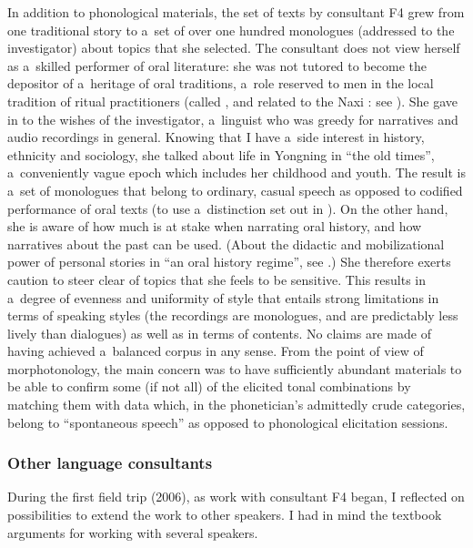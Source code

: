 In addition to phonological materials, the set of texts by consultant F4 grew from one traditional story to a~set of over one hundred monologues (addressed to the investigator) about topics that she selected. The consultant does not view herself as a~skilled performer of oral literature: she was not tutored to become the depositor of a~heritage of oral traditions, a~role reserved to men in the local tradition of ritual practitioners (called , and related to the Naxi : see \citealt{fangetal1995,lidazhu2015}). She gave in to the wishes of the investigator, a~linguist who was greedy for narratives and audio recordings in general. Knowing that I have a~side interest in history, ethnicity and sociology, she talked about life in Yongning in “the old times”, a~conveniently vague epoch which includes her childhood and youth. The result is a~set of monologues that belong to ordinary, casual speech as opposed to codified performance of oral texts (to use a~distinction set out in \citealt{dournes1990}). On the other hand, she is aware of how much is at stake when narrating {oral history}, and how narratives about the past can be used. (About the didactic and mobilizational power of personal stories in “an {oral history} regime”, see \citealt[100-105]{bulag2010}.) She therefore exerts caution to steer clear of topics that she feels to be sensitive. This results in a~degree of evenness and uniformity of style that entails strong limitations in terms of speaking styles (the recordings are monologues, and are predictably less lively than dialogues) as well as in terms of contents. No claims are made of having achieved a~balanced corpus in any sense. From the point of view of morphotonology, the main concern was to have sufficiently abundant materials to be able to confirm some (if not all) of the elicited tonal combinations by matching them with data which, in the phonetician's admittedly crude categories, belong to “spontaneous speech” as opposed to phonological elicitation sessions.

\subsubsection{Other language consultants}
\label{sec:otherlanguageconsultants}

During the first field trip (2006), as work with consultant F4 began, I reflected on possibilities to extend the work to other speakers. I had in mind the textbook arguments for working with several speakers. 

